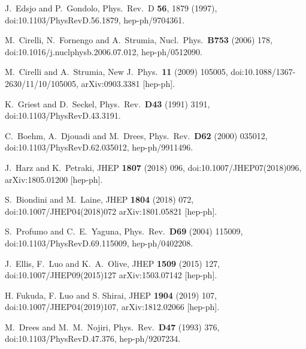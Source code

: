 \documentclass[a4paper,11pt]{article}
\begin{document}
\begin{thebibliography}{99}
  J.~Edsjo and P.~Gondolo,
  Phys.\ Rev.\ D {\bf 56}, 1879 (1997),
  doi:10.1103/PhysRevD.56.1879,
  hep-ph/9704361.

  M.~Cirelli, N.~Fornengo and A.~Strumia,
  Nucl.\ Phys.\ {\bf B753} (2006) 178,
  doi:10.1016/j.nuclphysb.2006.07.012,
hep-ph/0512090.
 
  M.~Cirelli and A.~Strumia,
  New J.\ Phys.\  {\bf 11} (2009) 105005,
  doi:10.1088/1367-2630/11/10/105005,
arXiv:0903.3381 [hep-ph].

K.~Griest and D.~Seckel,
Phys.\ Rev.\ {\bf D43} (1991) 3191,
doi:10.1103/PhysRevD.43.3191.

  C.~Boehm, A.~Djouadi and M.~Drees,
  Phys.\ Rev.\ {\bf D62} (2000) 035012,
  doi:10.1103/PhysRevD.62.035012,
  hep-ph/9911496.

  J.~Harz and K.~Petraki,
  JHEP {\bf 1807} (2018) 096,
  doi:10.1007/JHEP07(2018)096,
 arXiv:1805.01200 [hep-ph].

  S.~Biondini and M.~Laine,
  JHEP {\bf 1804} (2018) 072,
  doi:10.1007/JHEP04(2018)072
arXiv:1801.05821 [hep-ph].

  S.~Profumo and C.~E.~Yaguna,
  Phys.\ Rev.\ {\bf D69} (2004) 115009,
  doi:10.1103/PhysRevD.69.115009,
hep-ph/0402208.
 
  J.~Ellis, F.~Luo and K.~A.~Olive,
  JHEP {\bf 1509} (2015) 127,
  doi:10.1007/JHEP09(2015)127
arXiv:1503.07142 [hep-ph].

 H. Fukuda, F. Luo and S. Shirai, JHEP {\bf 1904} (2019) 107,
 doi:10.1007/JHEP04(2019)107, 
 arXiv:1812.02066 [hep-ph].

  M.~Drees and M.~M.~Nojiri,
  Phys.\ Rev.\ {\bf D47} (1993) 376,
  doi:10.1103/PhysRevD.47.376,
  hep-ph/9207234.


\end{thebibliography}
\end{document}
